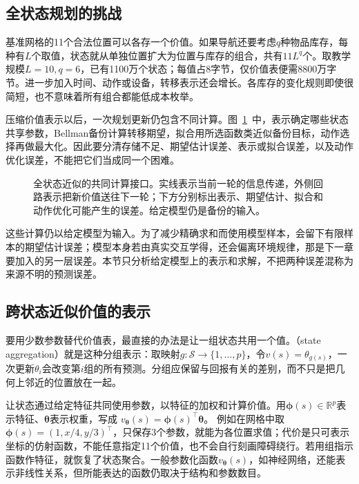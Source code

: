 \subsection{全状态规划的挑战}
\label{sec:rl-planning-global-budget}

基准网格的11个合法位置可以各存一个价值。如果导航还要考虑$q$种物品库存，每种有$L$个取值，状态就从单独位置扩大为位置与库存的组合，共有$11L^q$个。取教学规模$L=10,q=6$，已有1100万个状态；每值占8字节，仅价值表便需8800万字节。进一步加入时间、动作或设备，转移表示还会增长。各库存的变化规则即使很简短，也不意味着所有组合都能低成本枚举。

压缩价值表示以后，一次规划更新仍包含不同计算。图~\ref{fig:rl-planning-approximation-loop}~中，表示确定哪些状态共享参数，Bellman备份计算转移期望，拟合用所选函数类近似备份目标，动作选择再做最大化。因此要分清存储不足、期望估计误差、表示或拟合误差，以及动作优化误差，不能把它们当成同一个困难。

\begin{figure}[htbp]
 \centering
 
 \caption{全状态近似的共同计算接口。实线表示当前一轮的信息传递，外侧回路表示把新价值送往下一轮；下方分别标出表示、期望估计、拟合和动作优化可能产生的误差。给定模型仍是备份的输入。}
 \label{fig:rl-planning-approximation-loop}
\end{figure}

这些计算仍以给定模型为输入。为了减少精确求和而使用模型样本，会留下有限样本的期望估计误差；模型本身若由真实交互学得，还会偏离环境规律，那是下一章要加入的另一层误差。本节只分析给定模型上的表示和求解，不把两种误差混称为来源不明的预测误差。

\subsection{跨状态近似价值的表示}
\label{sec:rl-planning-representation}

要用少数参数替代价值表，最直接的办法是让一组状态共用一个值。（state aggregation）就是这种分组表示：取映射$g:\mathcal S\to\{1,\ldots,p\}$，令$v(s)=\theta_{g(s)}$，一次更新$\theta_i$会改变第$i$组的所有预测。分组应保留与回报有关的差别，而不只是把几何上邻近的位置放在一起。

让状态通过给定特征共同使用参数，以特征的加权和计算价值。用$\bm\phi(s)\in\mathbb R^p$表示特征、$\bm\theta$表示权重，写成
$v_{\bm\theta}(s)=\bm\phi(s)^\top\bm\theta$。
例如在网格中取$\bm\phi(s)=(1,x/4,y/3)^\top$，只保存3个参数，就能为各位置求值；代价是只可表示坐标的仿射函数，不能任意指定11个价值，也不会自行刻画障碍绕行。若用组指示函数作特征，就恢复了状态聚合。一般参数化函数$v_{\bm\theta}(s)$，如神经网络，还能表示非线性关系，但所能表达的函数仍取决于结构和参数数目。

